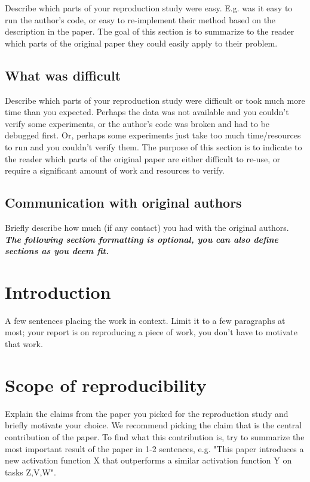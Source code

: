 \documentclass{article}
\begin{document}
Describe which parts of your reproduction study were easy. E.g. was it easy to run the author's code, or easy to re-implement their method based on the description in the paper. The goal of this section is to summarize to the reader which parts of the original paper they could easily apply to their problem. 

\subsection*{What was difficult}

Describe which parts of your reproduction study were difficult or took much more time than you expected. Perhaps the data was not available and you couldn't verify some experiments, or the author's code was broken and had to be debugged first. Or, perhaps some experiments just take too much time/resources to run and you couldn't verify them. The purpose of this section is to indicate to the reader which parts of the original paper are either difficult to re-use, or require a significant amount of work and resources to verify. 

\subsection*{Communication with original authors}

Briefly describe how much (if any contact) you had with the original authors.
\newpage
\textit{\textbf{
The following section formatting is \textbf{optional}, you can also define sections as you deem fit.
}}
\section{Introduction}
A  few  sentences  placing  the  work  in  context. Limit it to a few paragraphs at most; your report is on reproducing a piece of work, you don’t have to motivate that work.

\section{Scope of reproducibility}

Explain the claims from the paper you picked for the reproduction study and briefly motivate your choice. We recommend picking the claim that is the central contribution of the paper. To find what this contribution is, try to summarize the most important result of the paper in 1-2 sentences, e.g. "This paper introduces a new activation function X that outperforms a similar activation function Y on tasks Z,V,W". 
\end{document}
